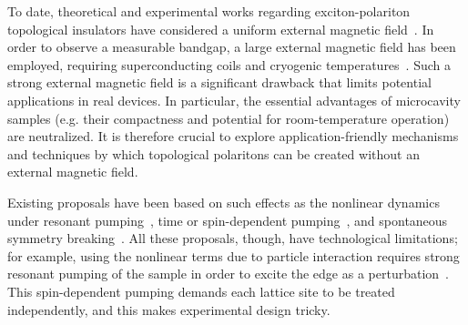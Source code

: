 
To date, theoretical and experimental works regarding exciton-polariton topological insulators have considered a uniform external magnetic field~\cite{Gulevich:2016aa,Nalitov:2015aa,Bardyn:2015aa,Yi:2016aa,PhysRevB.93.085438}.
In order to observe a measurable bandgap, a large external magnetic field has been employed, requiring superconducting coils and cryogenic temperatures~\cite{Klembt:2018aa}.
%
Such a strong external magnetic field is a significant drawback that limits potential applications in real devices.
In particular, the essential advantages of microcavity samples (e.g. their compactness and potential for room-temperature operation) are neutralized.
It is therefore crucial to explore application-friendly mechanisms and techniques by which topological polaritons can be created without an external magnetic field.


Existing proposals have been based on such effects as the nonlinear dynamics under resonant pumping~\cite{Mandal:2019aa}, time or spin-dependent pumping~\cite{Sigurdsson:2019aa}, and spontaneous symmetry breaking~\cite{Karzig:2015aa,Janot:2016aa}.
All these proposals, though, have technological limitations; for example, using the nonlinear terms due to particle interaction requires strong resonant pumping of the sample in order to excite the edge as a perturbation~\cite{Bardyn:2015aa,PhysRevB.93.085438}.
This spin-dependent pumping demands each lattice site to be treated independently, and this makes experimental design tricky.


